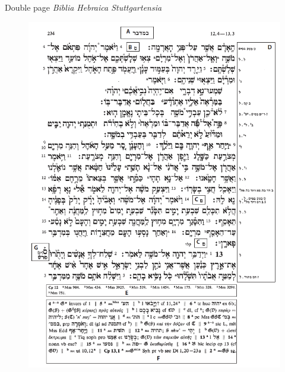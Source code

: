 \documentclass[11pt]{beamer}
\begin{document}
\begin{frame}{Double page \textit{Biblia Hebraica Stuttgartensia}}
\begin{minipage}{.45\textwidth}
    \begin{figure}
        \centering
        \includegraphics[width=1\linewidth]{img/BHSverso.png}
    \end{figure}
\end{minipage}
\hfill
\begin{minipage}{.45\textwidth}
    \begin{figure}
        \centering

\end{figure}
\end{minipage}
\end{frame}
\end{document}
